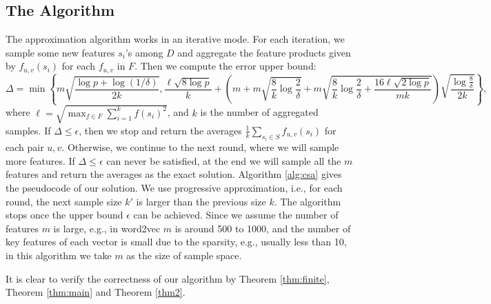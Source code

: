 \documentclass{article}
\begin{document}
\subsection{The Algorithm}
The approximation algorithm works in an iterative mode. For each iteration, we sample some new features $s_i$'s among $D$ and aggregate the feature products given by $f_{u,v}(s_i)$ for each $f_{u,v}$ in $F$. Then we compute the error upper bound:
$$\Delta = \min\left\{m\sqrt{\frac{\log p + \log(1/\delta)}{2k}}, \frac{\ell\sqrt{8\log p}}{k} +\left(m+m\sqrt{\frac{8}{k}\log \frac{2}{\delta}} + m\sqrt{\frac{8}{k}\log \frac{2}{\delta} + \frac{16\ell\sqrt{2\log p}}{mk}}\right)\sqrt{\frac{\log \frac{8}{\delta}}{2k}}\right\},$$
where $\ell = \sqrt{\max_{f\in F} \sum_{i=1}^k f(s_i)^2}$, and $k$ is the number of aggregated samples. 
If $\Delta \leq \epsilon$, then we stop and return the averages $\frac{1}{k}\sum_{s_i\in S}f_{u,v}(s_i)$ for each pair $u, v$. Otherwise, we continue to the next round, where we will sample more features. If $\Delta \leq \epsilon$ can never be satisfied, at the end we will sample all the $m$ features and return the averages as the exact solution. Algorithm \ref{alg:csa} gives the pseudocode of our solution. We use progressive approximation, i.e., for each round, the next sample size $k'$ is larger than the previous size $k$. The algorithm stops once the upper bound $\epsilon$ can be achieved. Since we assume the number of features $m$ is large, e.g., in word2vec $m$ is around 500 to 1000, and the number of key features of each vector is small due to the sparsity, e.g., usually less than 10, in this algorithm we take $m$ as the size of sample space.

It is clear to verify the correctness of our algorithm by Theorem \ref{thm:finite}, Theorem \ref{thm:main} and Theorem \ref{thm2}.
\end{document}
